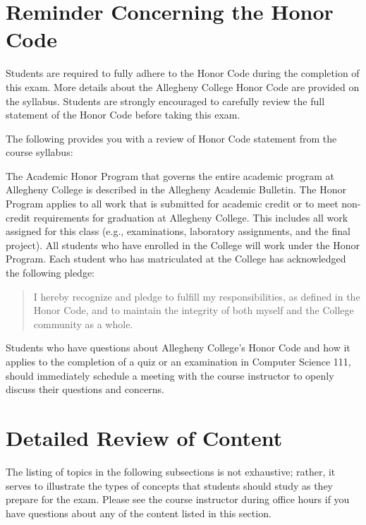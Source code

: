 \documentclass[11pt]{article}
\begin{document}
\vspace*{-.15in}
\section*{Reminder Concerning the Honor Code}

\noindent Students are required to fully adhere to the Honor Code during the completion of this exam. More details about
the Allegheny College Honor Code are provided on the syllabus. Students are strongly encouraged to carefully review the
full statement of the Honor Code before taking this exam.

\noindent The following provides you with a review of Honor Code statement from the course syllabus:

The Academic Honor Program that governs the entire academic program at Allegheny College is described in the Allegheny
Academic Bulletin. The Honor Program applies to all work that is submitted for academic credit or to meet non-credit
requirements for graduation at Allegheny College. This includes all work assigned for this class (e.g., examinations,
laboratory assignments, and the final project). All students who have enrolled in the College will work under the Honor
Program.  Each student who has matriculated at the College has acknowledged the following pledge:

\vspace*{-.11in}
\begin{quote}
  I hereby recognize and pledge to fulfill my responsibilities, as defined in the Honor Code, and to maintain the
  integrity of both myself and the College community as a whole.
\end{quote}
\vspace*{-.11in}

\noindent Students who have questions about Allegheny College's Honor Code and how it applies to the completion of a
quiz or an examination in Computer Science 111, should immediately schedule a meeting with the course instructor to
openly discuss their questions and concerns.

\vspace*{-.15in}
\section*{Detailed Review of Content}
\vspace*{-.1in}

The listing of topics in the following subsections is not exhaustive; rather, it serves to illustrate the types of
concepts that students should study as they prepare for the exam. Please see the course instructor during office hours
if you have questions about any of the content listed in this section.
\end{document}
